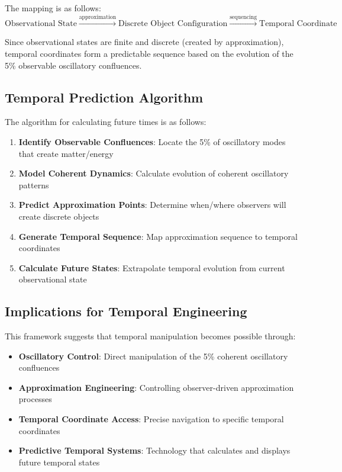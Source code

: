 \documentclass[11pt]{article}
\theoremstyle{remark}
\begin{document}
The mapping is as follows:
$$\text{Observational State} \xrightarrow{\text{approximation}} \text{Discrete Object Configuration} \xrightarrow{\text{sequencing}} \text{Temporal Coordinate}$$

Since observational states are finite and discrete (created by approximation), temporal coordinates form a predictable sequence based on the evolution of the 5\% observable oscillatory confluences.

\subsection{Temporal Prediction Algorithm}

The algorithm for calculating future times is as follows:

\begin{enumerate}
\item \textbf{Identify Observable Confluences}: Locate the 5\% of oscillatory modes that create matter/energy
\item \textbf{Model Coherent Dynamics}: Calculate evolution of coherent oscillatory patterns
\item \textbf{Predict Approximation Points}: Determine when/where observers will create discrete objects
\item \textbf{Generate Temporal Sequence}: Map approximation sequence to temporal coordinates
\item \textbf{Calculate Future States}: Extrapolate temporal evolution from current observational state
\end{enumerate}

\subsection{Implications for Temporal Engineering}

This framework suggests that temporal manipulation becomes possible through:

\begin{itemize}
\item \textbf{Oscillatory Control}: Direct manipulation of the 5\% coherent oscillatory confluences
\item \textbf{Approximation Engineering}: Controlling observer-driven approximation processes
\item \textbf{Temporal Coordinate Access}: Precise navigation to specific temporal coordinates
\item \textbf{Predictive Temporal Systems}: Technology that calculates and displays future temporal states
\end{itemize}
\end{document}
